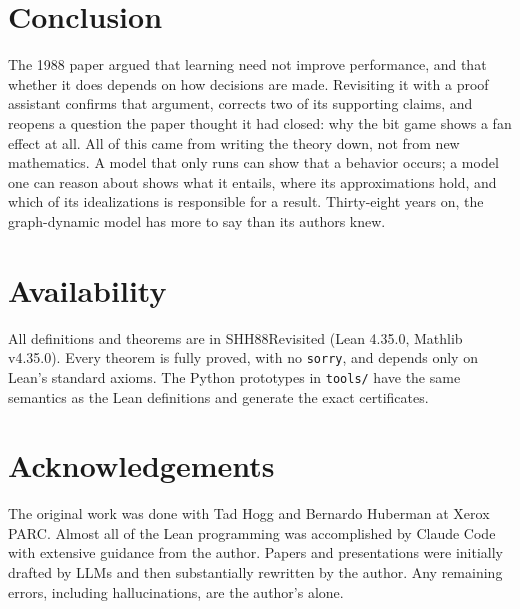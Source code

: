 \documentclass[11pt]{article}
\newcommand{\code}[1]{\texttt{#1}}
\begin{document}
\section{Conclusion}

The 1988 paper argued that learning need not improve performance, and that
whether it does depends on how decisions are made. Revisiting it with a
proof assistant confirms that argument, corrects two of its supporting
claims, and reopens a question the paper thought it had closed: why the
bit game shows a fan effect at all. All of this came from writing the
theory down, not from new mathematics. A model that only runs can
show that a behavior occurs; a model one can reason about shows what it
entails, where its approximations hold, and which of its idealizations is
responsible for a result. Thirty-eight years on, the graph-dynamic model
has more to say than its authors knew.

\section*{Availability}

All definitions and theorems are in SHH88Revisited \citep{shh88revisited}
(Lean 4.35.0, Mathlib v4.35.0). Every theorem is fully proved, with no
\code{sorry}, and depends only on Lean's standard axioms. The Python
prototypes in \code{tools/} have the same semantics as the Lean
definitions and generate the exact certificates.

\section*{Acknowledgements}

The original work was done with Tad Hogg and Bernardo Huberman at Xerox
PARC. Almost all of the Lean programming was accomplished by Claude Code
with extensive guidance from the author. Papers and presentations were
initially drafted by LLMs and then substantially rewritten by the author.
Any remaining errors, including hallucinations, are the author's alone.



\end{document}
